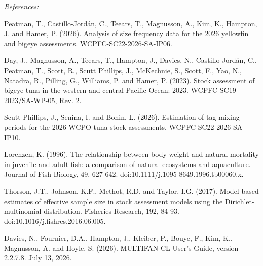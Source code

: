 \endgroup
\begingroup\footnotesize\sloppy\setlength{\emergencystretch}{2em}\noindent\textit{References:}\par
Peatman, T., Castillo-Jordán, C., Teears, T., Magnusson, A., Kim, K., Hampton, J. and Hamer, P. (2026). Analysis of size frequency data for the 2026 yellowfin and bigeye assessments. WCPFC-SC22-2026-SA-IP06.\par
Day, J., Magnusson, A., Teears, T., Hampton, J., Davies, N., Castillo-Jordán, C., Peatman, T., Scott, R., Scutt Phillips, J., McKechnie, S., Scott, F., Yao, N., Natadra, R., Pilling, G., Williams, P. and Hamer, P. (2023). Stock assessment of bigeye tuna in the western and central Pacific Ocean: 2023. WCPFC-SC19-2023/SA-WP-05, Rev. 2.\par
Scutt Phillips, J., Senina, I. and Bonin, L. (2026). Estimation of tag mixing periods for the 2026 WCPO tuna stock assessments. WCPFC-SC22-2026-SA-IP10.\par
Lorenzen, K. (1996). The relationship between body weight and natural mortality in juvenile and adult fish: a comparison of natural ecosystems and aquaculture. Journal of Fish Biology, 49, 627-642. doi:10.1111/j.1095-8649.1996.tb00060.x.\par
Thorson, J.T., Johnson, K.F., Methot, R.D. and Taylor, I.G. (2017). Model-based estimates of effective sample size in stock assessment models using the Dirichlet-multinomial distribution. Fisheries Research, 192, 84-93. doi:10.1016/j.fishres.2016.06.005.\par
Davies, N., Fournier, D.A., Hampton, J., Kleiber, P., Bouye, F., Kim, K., Magnusson, A. and Hoyle, S. (2026). MULTIFAN-CL User's Guide, version 2.2.7.8. July 13, 2026.\par\endgroup
